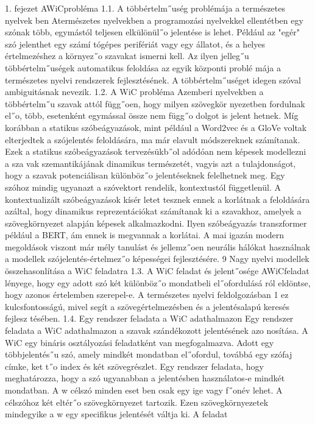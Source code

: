 \documentclass[12pt]{report}
\theoremstyle{definition}
\begin{document}
1. fejezet
 AWiCprobléma
 1.1. A többértelm˝uség problémája a természetes nyelvek
ben
 Atermészetes nyelvekben a programozási nyelvekkel ellentétben egy szónak több,
 egymástól teljesen elkülönül˝o jelentése is lehet. Például az "egér" szó jelenthet egy számí
tógépes perifériát vagy egy állatot, és a helyes értelmezéshez a környez˝o szavakat ismerni
 kell. Az ilyen jelleg˝u többértelm˝uségek automatikus feloldása az egyik központi problé
mája a természetes nyelvi rendszerek fejlesztésének. A többértelm˝uséget idegen szóval
 ambiguitásnak nevezik.
 1.2. A WiC probléma
 Azemberi nyelvekben a többértelm˝u szavak attól függ˝oen, hogy milyen szövegkör
nyezetben fordulnak el˝o, több, esetenként egymással össze nem függ˝o dolgot is jelent
hetnek. Míg korábban a statikus szóbeágyazások, mint például a Word2vec és a GloVe
 voltak elterjedtek a szójelentés feloldására, ma már elavult módszereknek számítanak.
 Ezek a statikus szóbeágyazások tervezésükb˝ol adódóan nem képesek modellezni a sza
vak szemantikájának dinamikus természetét, vagyis azt a tulajdonságot, hogy a szavak
 potenciálisan különböz˝o jelentéseknek felelhetnek meg. Egy szóhoz mindig ugyanazt a
 szóvektort rendelik, kontextustól függetlenül. A kontextualizált szóbeágyazások kísér
letet tesznek ennek a korlátnak a feloldására azáltal, hogy dinamikus reprezentációkat
 számítanak ki a szavakhoz, amelyek a szövegkörnyezet alapján képesek alkalmazkodni.
 Ilyen szóbeágyazás transzformer például a BERT, ám ennek is megvannak a korlátai. A
 mai igazán modern megoldások viszont már mély tanulást és jellemz˝oen neurális hálókat
 használnak a modellek szójelentés-értelmez˝o képességei fejlesztésére.
 9
Nagy nyelvi modellek összehasonlítása a WiC feladatra
 1.3. A WiC feladat és jelent˝osége
 AWiCfeladat lényege, hogy egy adott szó két különböz˝o mondatbeli el˝ofordulásá
ról eldöntse, hogy azonos értelemben szerepel-e. A természetes nyelvi feldolgozásban 1
 ez kulcsfontosságú, mivel segít a szövegértelmezésben és a jelentésalapú keresés fejlesz
tésében.
 1.4. Egy rendszer feladata a WiC adathalmazon
 Egy rendszer feladata a WiC adathalmazon a szavak szándékozott jelentésének azo
nosítása. A WiC egy bináris osztályozási feladatként van megfogalmazva. Adott egy
 többjelentés˝u szó, amely mindkét mondatban el˝ofordul, továbbá egy szófaj címke, ket
t˝o index és két szövegrészlet. Egy rendszer feladata, hogy meghatározza, hogy a szó
 ugyanabban a jelentésben használatos-e mindkét mondatban. A w célszó minden eset
ben csak egy ige vagy f˝onév lehet. A célszóhoz két eltér˝o szövegkörnyezet tartozik.
 Ezen szövegkörnyezetek mindegyike a w egy specifikus jelentését váltja ki. A feladat
\end{document}
